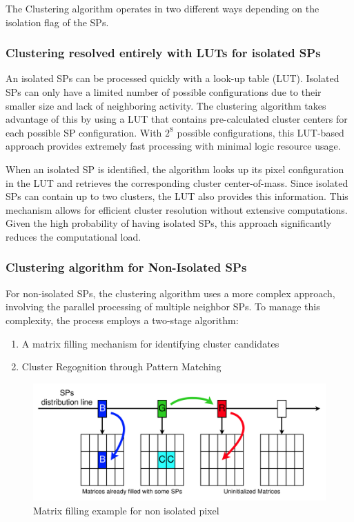 The Clustering algorithm operates in two different ways depending on the isolation flag of the SPs.
\subsubsection{Clustering resolved entirely with LUTs for isolated SPs}
An isolated SPs can be processed quickly with a look-up table (LUT). Isolated SPs can only have a limited number of possible configurations due to their smaller size and lack of neighboring activity. The clustering algorithm takes advantage of this by using a LUT that contains pre-calculated cluster centers for each possible SP configuration. With $2^8$ possible configurations, this LUT-based approach provides extremely fast processing with minimal logic resource usage.

When an isolated SP is identified, the algorithm looks up its pixel configuration in the LUT and retrieves the corresponding cluster center-of-mass. Since isolated SPs can contain up to two clusters, the LUT also provides this information. This mechanism allows for efficient cluster resolution without extensive computations. Given the high probability of having isolated SPs, this approach significantly reduces the computational load.

\subsubsection{Clustering algorithm for Non-Isolated SPs}
For non-isolated SPs, the clustering algorithm uses a more complex approach, involving the parallel processing of multiple neighbor SPs. To manage this complexity, the process employs a two-stage algorithm\cite{Lazzari:2813167}:
\begin{enumerate}
    \item A matrix filling mechanism for identifying cluster candidates
    \item Cluster Regognition through Pattern Matching
\end{enumerate}
\begin{figure}
    \centering
    \includegraphics[width=\textwidth]{figures/matrix_filling_clustering.png}
    \caption{Matrix filling example for non isolated pixel}
    \label{fig:matrix_filling_clustering}
\end{figure}

